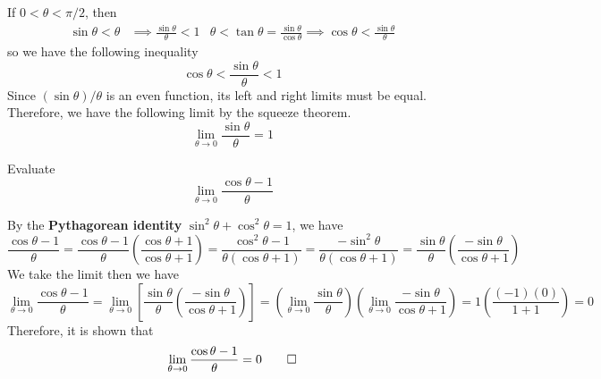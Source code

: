 If \(0<\theta<\pi/2\), then
\begin{align*}
    \sin\theta<\theta &\implies \frac{\sin\theta}{\theta}<1
    & \theta<\tan\theta=\frac{\sin\theta}{\cos\theta}\implies\cos\theta
    <\frac{\sin\theta}{\theta}
\end{align*}
so we have the following inequality
\[\cos\theta<\frac{\sin\theta}{\theta}<1\]
Since \((\sin\theta)/\theta\) is an even function, its left and right limits
must be equal.
Therefore, we have the following limit by the squeeze theorem.
\[\lim_{\theta\to 0}\frac{\sin\theta}{\theta}=1\]
\begin{problem}
    Evaluate \[\lim_{\theta\to 0}\frac{\cos\theta-1}{\theta}\]
\end{problem}
\begin{solution}
    By the \textbf{Pythagorean identity} \(\sin^2\theta+\cos^2\theta=1\),
    we have
    \[\frac{\cos\theta-1}{\theta}
    =\frac{\cos\theta-1}{\theta}\left(\frac{\cos\theta+1}{\cos\theta+1}\right)
    =\frac{\cos^2\theta-1}{\theta(\cos\theta+1)}
    =\frac{-\sin^2\theta}{\theta(\cos\theta+1)}
    =\frac{\sin\theta}{\theta}\left(\frac{-\sin\theta}{\cos\theta+1}\right)\]
    We take the limit then we have
    \[\lim_{\theta\to 0}\frac{\cos\theta-1}{\theta}
    =\lim_{\theta\to 0}\left[\frac{\sin\theta}{\theta}
    \left(\frac{-\sin\theta}{\cos\theta+1}\right)\right]
    =\left(\lim_{\theta\to 0}\frac{\sin\theta}{\theta}\right)
    \left(\lim_{\theta\to 0}\frac{-\sin\theta}{\cos\theta+1}\right)
    =1\left(\frac{(-1)(0)}{1+1}\right)=0\]
    Therefore, it is shown that
    \[\lim_{\theta\to 0}\frac{\cos\theta-1}{\theta}=0\qedhere\]
\end{solution}